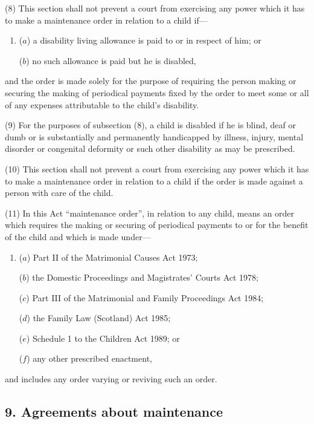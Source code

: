 \documentclass[12pt,a4paper]{article}
\begin{document}
(8) This section shall not prevent a court from exercising any power which it has to make a maintenance order in relation to a child if—
\begin{enumerate}\item[]
($a$) a disability living allowance is paid to or in respect of him; or

($b$) no such allowance is paid but he is disabled,
\end{enumerate}
and the order is made solely for the purpose of requiring the person making or securing the making of periodical payments fixed by the order to meet some or all of any expenses attributable to the child’s disability.

(9) For the purposes of subsection (8), a child is disabled if he is blind, deaf or dumb or is substantially and permanently handicapped by illness, injury, mental disorder or congenital deformity or such other disability as may be prescribed.

(10) This section shall not prevent a court from exercising any power which it has to make a maintenance order in relation to a child if the order is made against a person with care of the child.

(11) In this Act “maintenance order”, in relation to any child, means an order which requires the making or securing of periodical payments to or for the benefit of the child and which is made under—
\begin{enumerate}\item[]
($a$) Part II of the Matrimonial Causes Act 1973;

($b$) the Domestic Proceedings and Magistrates' Courts Act 1978;

($c$) Part III of the Matrimonial and Family Proceedings Act 1984;

($d$) the Family Law (Scotland) Act 1985;

($e$) Schedule 1 to the Children Act 1989; or

($f$) any other prescribed enactment,
\end{enumerate}
and includes any order varying or reviving such an order.


\subsection{9. Agreements about maintenance}
\end{document}

